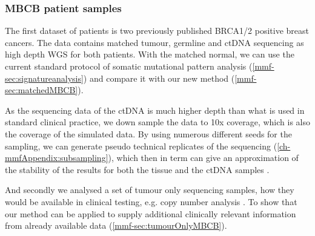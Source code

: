 
\subsubsection{MBCB patient samples}
\label{mmf-sec:brcapatients}
The first dataset of patients is two previously published BRCA1/2 positive breast cancers. The data contains matched tumour, germline and ctDNA sequencing as high depth WGS for both patients. With the matched normal, we can use the current standard protocol of somatic mutational pattern analysis (\autoref{mmf-sec:signatureanalysis}) and compare it with our new method (\autoref{mmf-sec:matchedMBCB}). 

As the sequencing data of the ctDNA is much higher depth than what is used in standard clinical practice, we down sample the data to 10x coverage, which is also the coverage of the simulated data. By using numerous different seeds for the sampling, we can generate pseudo technical replicates of the sequencing (\autoref{ch-mmfAppendix:subsampling}), which then in term can give an approximation of the stability of the results for both the tissue and the ctDNA samples .

And secondly we analysed a set of tumour only sequencing samples, how they would be available in clinical testing, e.g. copy number analysis \cite{Homburger2019,Chen2021}. To show that our method can be applied to supply additional clinically relevant information from already available data (\autoref{mmf-sec:tumourOnlyMBCB}). 


